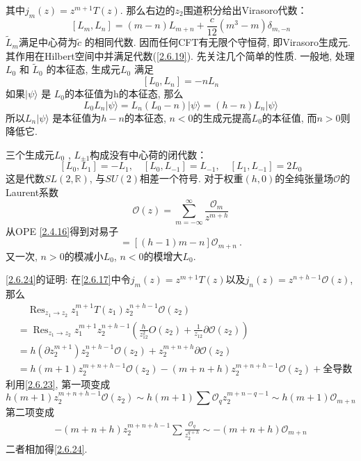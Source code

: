 其中$j_{m}(z)=z^{m+1} T(z)$.
那么右边的$z_2$围道积分给出Virasoro代数：
\begin{equation}\label{2.6.19}
\left[L_{m}, L_{n}\right]=(m-n) L_{m+n}+\frac{c}{12}\left(m^{3}-m\right) \delta_{m,-n}
\end{equation}
$\tilde{L}_{m}$满足中心荷为$\tilde{c}$ 的相同代数.
因而任何CFT有无限个守恒荷, 即Virasoro生成元. 其作用在Hilbert空间中并满足代数(\ref{2.6.19}). 先关注几个简单的性质. 一般地, 处理$L_{0}$ 和 $\tilde{L}_{0}$ 的本征态, 生成元$L_{0}$ 满足
\begin{equation}
\left[L_{0}, L_{n}\right]=-n L_{n}
\end{equation}
如果$|\psi\rangle$ 是 $L_{0}$的本征值为h的本征态, 那么
\begin{equation}
L_{0} L_{n}|\psi\rangle=L_{n}\left(L_{0}-n\right)|\psi\rangle=(h-n) L_{n}|\psi\rangle
\end{equation}
所以$L_n|\psi\rangle$ 是本征值为$h-n$的本征态, $n<0$的生成元提高$L_{0}$的本征值, 而$n>0$则降低它.

三个生成元$L_{0}$ ,  $L_{\pm 1}$构成没有中心荷的闭代数：
\begin{equation}
\left[L_{0}, L_{1}\right]=-L_{1}, \quad\left[L_{0}, L_{-1}\right]=L_{-1}, \quad\left[L_{1}, L_{-1}\right]=2 L_{0}
\end{equation}
这是代数$SL(2,\mathds{R})$, 与$SU(2)$相差一个符号. 对于权重$(h,0)$的全纯张量场$\mathcal{O}$的Laurent系数
\begin{equation}
\mathcal{O}(z)=\sum_{m=-\infty}^{\infty} \frac{\mathcal{O}_{m}}{z^{m+h}} \label{2.6.23}
\end{equation}
从OPE \eqref{2.4.16}得到对易子
\begin{equation}
[L_{m}, \mathcal{O}_{n}]=[(h-1) m-n] \mathcal{O}_{m+n} \:. \label{2.6.24}
\end{equation}
又一次,  $n>0$的模减小$L_0$, $n<0$的模增大$L_0$.

\begin{tcolorbox}
\eqref{2.6.24}的证明: 在\eqref{2.6.17}中令$j_{m}(z)=z^{m+1} T(z)$以及$j_{n}(z)=z^{n+h-1} \mathcal{O}(z)$, 那么
\begin{align*}
&\quad \operatorname{Res}_{z_1 \rightarrow z_2}  z_1^{m+1} T(z_{1}) z_2^{n+h-1} \mathcal{O}(z_{2})\\
&=\operatorname{Res}_{z_1 \rightarrow z_2} z_1^{m+1} z_2^{n+h-1}\left(\frac{h}{z_{12}^2} O(z_2)+\frac{1}{z_{12}} \partial \mathcal{O}(z_2)\right)\\
&=h(\partial z_2^{m+1})z_2^{n+h-1}\mathcal{O}(z_2)+z_2^{m+n+h}\partial\mathcal{O}(z_2)\\
&=h(m+1)z_2^{m+n+h-1}\mathcal{O}(z_2)-(m+n+h)z_2^{m+n+h-1}\mathcal{O}(z_2)+ \text{全导数}
\end{align*}
利用\eqref{2.6.23}, 第一项变成
$$h(m+1)z_2^{m+n+h-1}\mathcal{O}(z_2) \sim h(m+1) \sum \mathcal{O}_q z_2^{m+n-q-1} \sim h(m+1)\mathcal{O}_{m+n}$$
第二项变成
\begin{align*}
-(m+n+h) z_{2}^{m+n+h-1} \sum \frac{\mathcal{O}_{q}}{z_{2}^{q+h}} \sim-(m+n+h) \mathcal{O}_{m+n}
\end{align*}
二者相加得\eqref{2.6.24}.
\end{tcolorbox}

